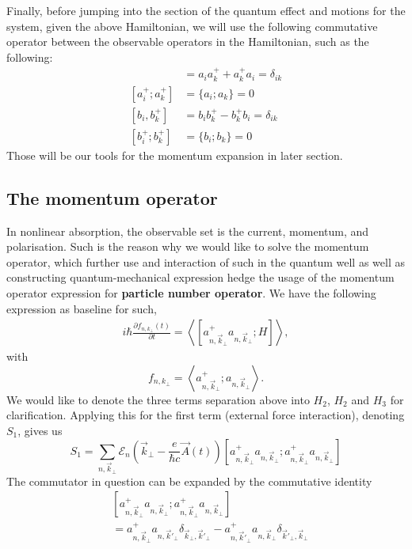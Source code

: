 \documentclass[%
 reprint,
 amsmath,amssymb,
 aps,
]{revtex4-2}
\begin{document}
Finally, before jumping into the section of the quantum effect and motions for the system, given the above Hamiltonian, we will use the following commutative operator between the observable operators in the Hamiltonian, such as the following: 
\begin{align}
     [a_{i} ; a_{k}^{+}]  &= a_{i}a_{k}^{+} + a^{+}_{k}a_{i} = \delta_{ik} \\
    [a_{i}^{+} ; a_{k}^{+}] & = \{ a_{i}; a_{k} \} = 0 \\
    [b_{i} , b_{k}^{+}] & = b_{i}b^{+}_{k} - b_{k}^{+}b_{i} = \delta_{ik} \\
    [b_{i}^{+}; b_{k}^{+}] &= \{b_{i} ; b_{k}\} = 0
\end{align}
Those will be our tools for the momentum expansion in later section. 
\subsection{The momentum operator}
In nonlinear absorption, the observable set is the current, momentum, and polarisation. Such is the reason why we would like to solve the momentum operator, which further use and interaction of such in the quantum well as well as constructing quantum-mechanical expression hedge the usage of the momentum operator expression for \textbf{particle number operator}. We have the following expression as baseline for such, 
\begin{align}
    i \hbar \frac{\partial f_{n, k_{\perp}}(t)}{\partial t} = \left\langle \left[ a^{+}_{n,\vec{k}_{\perp}}  a_{n,\vec{k}_{\perp}}; H \right] \right\rangle,
\end{align}
with
\begin{equation}
    f_{n, k_{\perp}} = \left\langle a^{+}_{n,\vec{k}_{\perp}} ; a_{n,\vec{k}_{\perp}} \right\rangle.
\end{equation}
We would like to denote the three terms separation above into $H_{2}$, $H_{2}$ and $H_{3}$ for clarification. Applying this for the first term (external force interaction), denoting $S_{1}$, gives us 
\begin{equation}
    S_{1} = \sum_{n,\vec{k}_{\perp}} \mathcal{E}_{n}\left(\vec{k}_{\perp} - \frac{e}{\hbar c} \vec{A}(t)\right)\left[ a^{+}_{n,\vec{k}_{\perp}}  a_{n,\vec{k}_{\perp}}; a^{+}_{n,\vec{k}_{\perp}} a_{n,\vec{k}_{\perp}} \right]
\end{equation}
The commutator in question can be expanded by the commutative identity
\begin{equation}
    \begin{split}
        &\left[ a^{+}_{n,\vec{k}_{\perp}}  a_{n,\vec{k}_{\perp}}; a^{+}_{n,\vec{k}_{\perp}} a_{n,\vec{k}_{\perp}} \right] \\
        &= a^{+}_{n,\vec{k}_{\perp}} a_{n,\vec{k}'_{\perp}} \delta_{\vec{k}_{\perp},\vec{k}'_{\perp}} - a^{+}_{n,\vec{k}'_{\perp}} a_{n,\vec{k}_{\perp}} \delta_{\vec{k}'_{\perp},\vec{k}_{\perp}}
    \end{split}
\end{equation}
\end{document}
